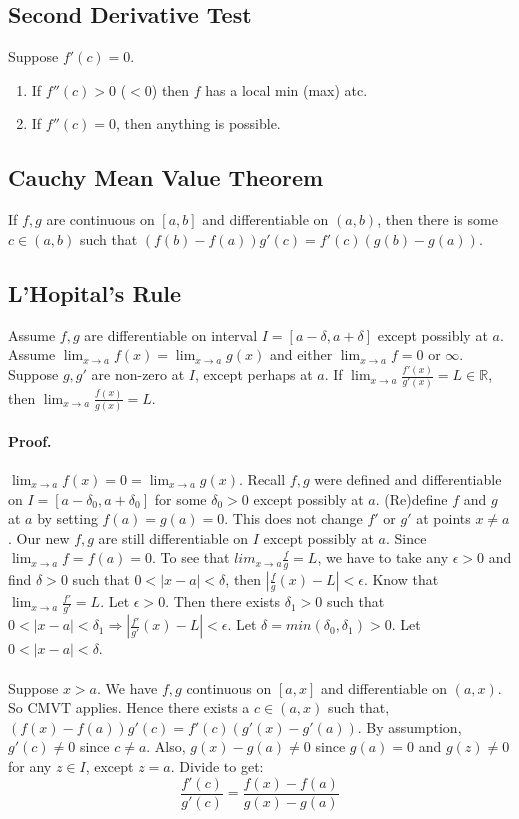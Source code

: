 \documentclass[11pt]{article}
\newcommand{\R}{{\mathbb R}}
\begin{document}
\subsection{Second Derivative Test}
Suppose $f'(c) = 0$.
\begin{enumerate}
	\item If $f''(c) > 0$ ($< 0$) then $f$ has a local min (max) atc.
	\item If $f''(c) = 0$, then anything is possible.
\end{enumerate}

\subsection{Cauchy Mean Value Theorem}
If $f, g$ are continuous on $[a, b]$ and differentiable on $(a, b)$, then there is some $c \in (a, b)$ such that
$(f(b) - f(a))g'(c) = f'(c)(g(b) - g(a))$.

\subsection{L'Hopital's Rule}
Assume $f, g$ are differentiable on interval $I = [a -\delta, a + \delta]$ except possibly at $a$. Assume $\lim_{x \to a} f(x)  = \lim_{x \to a} g(x)$ and either $\lim_{x \to a} f = 0$ or $\infty$. Suppose $g, g'$ are non-zero at $I$, except perhaps at $a$. If $\lim_{x \to a} \frac{f'(x)}{g'(x)} = L \in \R$, then $\lim_{x \to a} \frac{f(x)}{g(x)} = L$.

\paragraph{Proof.}
$\lim_{x \to a} f(x) = 0 = \lim_{x \to a} g(x)$. Recall $f, g$ were defined and differentiable on $I = [a - \delta_0, a + \delta_0]$ for some $\delta_0 > 0$ except possibly at $a$. (Re)define $f$ and $g$ at $a$ by setting $f(a) = g(a) = 0$. This does not change $f'$ or $g'$ at points $x \neq a$. Our new $f, g$ are still differentiable on $I$ except possibly at $a$. Since $\lim_{x \to a} f = f(a) = 0$. To see that $lim_{x \to a} \frac{f}{g} = L$, we have to take any $\epsilon > 0$ and find $\delta > 0$ such that $0 < |x - a| < \delta$, then $|\frac{f}{g}(x) - L| < \epsilon$. Know that $\lim_{x \to a} \frac{f'}{g'} = L$. Let $\epsilon > 0$. Then there exists $\delta_1 > 0$ such that $0 < |x - a| < \delta_1 \Longrightarrow |\frac{f'}{g'}(x) - L| < \epsilon$. Let $\delta = min(\delta_0, \delta_1) > 0$. Let $0 < |x - a| < \delta$.\\\\
Suppose $x > a$. We have $f, g$ continuous on $[a, x]$ and differentiable on $(a, x)$. So CMVT applies. Hence there exists a $c \in (a, x)$ such that, $(f(x) - f(a))g'(c) = f'(c)(g'(x) - g'(a))$. By assumption, $g'(c) \neq 0$ since $c \neq a$. Also, $g(x) - g(a) \neq 0$ since $g(a) = 0$ and $g(z) \neq 0$ for any $z \in I$, except $z = a$. Divide to get:\\
\begin{equation*}
\frac{f'(c)}{g'(c)} = \frac{f(x) - f(a)}{g(x) - g(a)}
\end{equation*}
\end{document}

